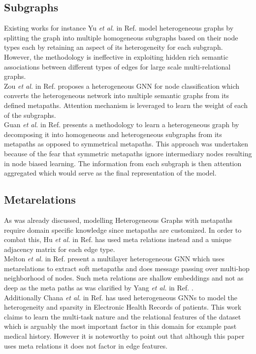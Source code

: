 \documentclass{report} %
\begin{document}
\subsection{Subgraphs}\label{subsec:HGNN Subgraphs}
Existing works for instance Yu \textit{et al.} in Ref. \cite{PR-HGNN-2024} model heterogeneous graphs by splitting the graph into multiple 
homogeneous subgraphs based on their node types each by retaining an aspect of its heterogeneity for each subgraph.
However, the methodology is ineffective in exploiting hidden rich semantic associations between different types of edges for large scale multi-relational graphs.\\
Zou \textit{et al.} in Ref. \cite{HNNC-2023} proposes a heterogeneous \ac{GNN} for node classification which converts the 
heterogeneous network into multiple semantic graphs from its defined metapaths. Attention mechanism is leveraged to learn the weight of each of the subgraphs. \\ 
Guan \textit{et al.} in Ref. \cite{HGNNSG-2023} presents a methodology to learn a heterogeneous graph by decomposing it into homogeneous and heterogeneous subgraphs from its metapaths 
as opposed to symmetrical metapaths. This approach was undertaken because of the fear that symmetric metapaths ignore intermediary nodes resulting in node biased learning. 
The information from each subgraph is then attention aggregated which would serve as the final representation of the model.

\subsection{Metarelations}\label{subsec:HGNN Metarelations}
As was already discussed, modelling Heterogeneous Graphs with metapaths require domain specific knowledge since metapaths are customized. 
In order to combat this, Hu \textit{et al.} in Ref. \cite{HGT-2022} has used meta relations instead and a unique adjacency matrix for each edge type.\\
Melton \textit{et al.} in Ref. \cite{MHGNN-2023} present a multilayer heterogeneous \ac{GNN} which uses metarelations to extract soft metapaths 
and does message passing over multi-hop neighborhood of nodes.
Such meta relations are shallow embeddings and not as deep as the meta paths as was clarified by Yang \textit{et al.} in Ref. \cite{HGNN-2020}. \\
Additionally Chana \textit{et al.} in Ref. \cite{EHR HGNN-2024} has used heterogeneous \ac{GNN}s to model the heterogeneity and sparsity in Electronic 
Health Records of patients. This work claims to learn the multi-task nature and  the relational features of the dataset which is arguably the most important factor in 
this domain for example past medical history. However it is noteworthy to point out that although this paper uses meta relations it does not factor in edge features.\\
\end{document}
